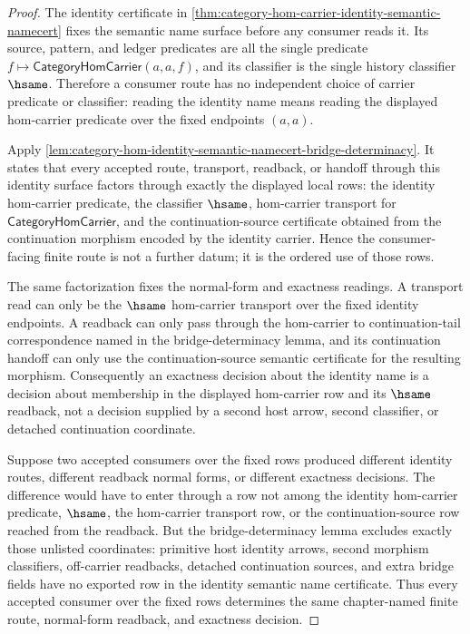 \begin{proof}
The identity certificate in
\autoref{thm:category-hom-carrier-identity-semantic-namecert} fixes the
semantic name surface before any consumer reads it. Its source, pattern, and
ledger predicates are all the single predicate
$f\mapsto\mathsf{CategoryHomCarrier}(a,a,f)$, and its classifier is the single
history classifier $\hsame$. Therefore a consumer route has no independent
choice of carrier predicate or classifier: reading the identity name means
reading the displayed hom-carrier predicate over the fixed endpoints $(a,a)$.

Apply
\autoref{lem:category-hom-identity-semantic-namecert-bridge-determinacy}. It
states that every accepted route, transport, readback, or handoff through this
identity surface factors through exactly the displayed local rows: the identity
hom-carrier predicate, the classifier $\hsame$, hom-carrier transport for
$\mathsf{CategoryHomCarrier}$, and the continuation-source certificate obtained
from the continuation morphism encoded by the identity carrier. Hence the
consumer-facing finite route is not a further datum; it is the ordered use of
those rows.

The same factorization fixes the normal-form and exactness readings. A
transport read can only be the $\hsame$ hom-carrier transport over the fixed
identity endpoints. A readback can only pass through the hom-carrier to
continuation-tail correspondence named in the bridge-determinacy lemma, and its
continuation handoff can only use the continuation-source semantic certificate
for the resulting morphism. Consequently an exactness decision about the
identity name is a decision about membership in the displayed hom-carrier row
and its $\hsame$ readback, not a decision supplied by a second host arrow,
second classifier, or detached continuation coordinate.

Suppose two accepted consumers over the fixed rows produced different identity
routes, different readback normal forms, or different exactness decisions. The
difference would have to enter through a row not among the identity
hom-carrier predicate, $\hsame$, the hom-carrier transport row, or the
continuation-source row reached from the readback. But the bridge-determinacy
lemma excludes exactly those unlisted coordinates: primitive host identity
arrows, second morphism classifiers, off-carrier readbacks, detached
continuation sources, and extra bridge fields have no exported row in the
identity semantic name certificate. Thus every accepted consumer over the fixed
rows determines the same chapter-named finite route, normal-form readback, and
exactness decision.
\end{proof}
